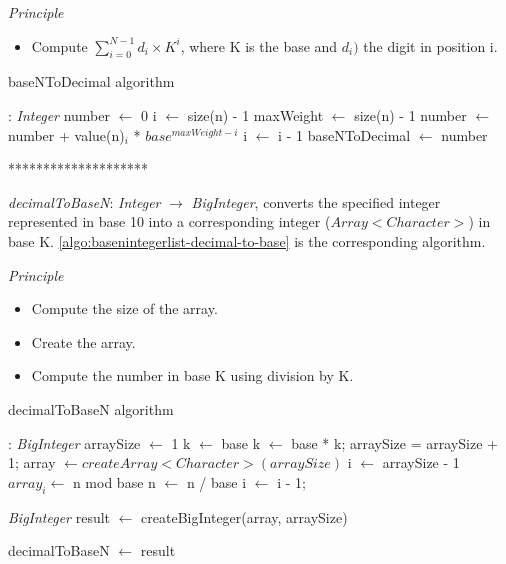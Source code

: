 \documentclass[book, nodocumentinfo]{upmethodology-document}
\newcommand{\separator}{\centerline{********************}}
\begin{document}
\emph{Principle}
\begin{itemize}
    \item Compute \(\sum\limits_{i=0}^{N - 1}{d_i \times K^i}\), where K is the base and \(d_i)\) the digit in position i.
\end{itemize}

\begin{algorithm}[H]
    \caption{baseNToDecimal algorithm}
    \label{algo:basenintegerlist-base-to-decimal}

    \begin{algorithmic}
         : \emph{Integer}
            \State number \(\leftarrow\) 0
            \State i \(\leftarrow\) size(n) - 1
            \State maxWeight \(\leftarrow\) size(n) - 1
                \State number \(\leftarrow\) number + value(n)\(_i\) * \(base^{maxWeight - i}\)
                \State i \(\leftarrow\) i - 1
            \EndWhile
            \State baseNToDecimal \(\leftarrow\) number
        \EndFunction
    \end{algorithmic}
\end{algorithm}

\separator

\emph{decimalToBaseN}: \emph{Integer} \(\rightarrow\) \emph{BigInteger},
converts the specified integer represented in base 10 into a corresponding integer (\(Array<Character>\)) in base K.
\ref{algo:basenintegerlist-decimal-to-base} is the corresponding algorithm.

\emph{Principle}
\begin{itemize}
    \item Compute the size of the array.
    \item Create the array.
    \item Compute the number in base K using division by K.
\end{itemize}

\begin{algorithm}[H]
    \caption{decimalToBaseN algorithm}
    \label{algo:basenintegerlist-decimal-to-base}

    \begin{algorithmic}
         : \emph{BigInteger}
            \State arraySize \(\leftarrow\) 1
            \State k \(\leftarrow\) base
                \State k \(\leftarrow\) base * k;
                \State arraySize = arraySize + 1;
            \EndWhile
            \State array \(\leftarrow createArray<Character>(arraySize)\)
            \State i \(\leftarrow\) arraySize - 1
            \Repeat
                \State \(array_{i} \leftarrow \) n mod base
                \State n \(\leftarrow\) n / base
                \State i \(\leftarrow\) i - 1;

            \State \emph{BigInteger} result \(\leftarrow\) createBigInteger(array, arraySize)

            \State decimalToBaseN \(\leftarrow\) result
        \EndFunction
    \end{algorithmic}
\end{algorithm}
\end{document}
